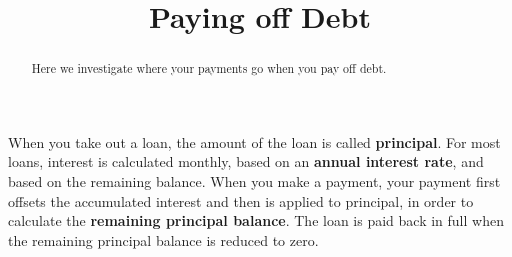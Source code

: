\documentclass{ximera}
\title{Paying off Debt}
\begin{document}
\begin{abstract}
Here we investigate where your payments go when you pay off debt.
\end{abstract}
\maketitle

When you take out a loan, the amount of the loan is called
\textbf{principal}.  For most loans, interest is calculated monthly,
based on an \textbf{annual interest rate}, and based on the remaining
balance.  When you make a payment, your payment first offsets the
accumulated interest and then is applied to principal, in order to
calculate the \textbf{remaining principal balance}.  The loan is paid
back in full when the remaining principal balance is reduced to zero.
\end{document}
